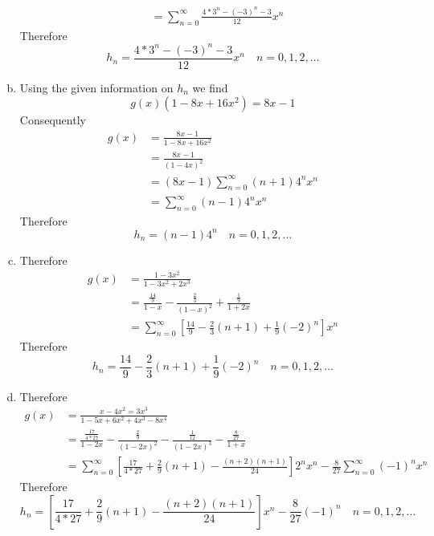 \documentclass[UTF8]{article}
\begin{document}
\begin{enumerate}[(a)]
\begin{equation}
\begin{aligned}
          &= \sum_{n = 0}^\infty \frac{4*3^{n} - {(-3)}^{n} - 3}{12} x^{n}
          \nonumber
          \end{aligned}
          \end{equation}
          Therefore
          $$ h_{n} = \frac{4*3^{n} - {(-3)}^{n} - 3}{12} x^{n} \quad n=0,1,2, \dots $$
    \item Using the given information on $ h_{n} $ we find
          $$ g(x)(1 - 8x + 16x^2)  = 8x - 1 $$
          Consequently
          \begin{equation}
          \begin{aligned}
          g(x) &= \frac{8x - 1}{1 - 8x + 16x^2} \\
          &= \frac{8x - 1}{(1 - 4x)^2} \\
          &= (8x - 1)\sum_{n = 0}^\infty (n + 1)4^n x^n \\
          &= \sum_{n = 0}^\infty (n - 1)4^n x^n
          \nonumber
          \end{aligned}
          \end{equation}
          Therefore
          $$ h_{n} = (n - 1)4^n \quad n=0,1,2, \dots $$
    \item Therefore
          \begin{equation}
          \begin{aligned}
          g(x) &= \frac{1 - 3x^2}{1 - 3x^2 + 2x^3} \\
          &= \frac{\frac{14}{9}}{1 - x} - \frac{\frac{2}{3}}{(1 - x)^2} + \frac{\frac{1}{9}}{1 + 2x} \\
          &= \sum_{n = 0}^\infty [\frac{14}{9} - \frac{2}{3}(n + 1) + \frac{1}{9}(-2)^n] x^{n}
          \nonumber
          \end{aligned}
          \end{equation}
          Therefore
          $$ h_{n} = \frac{14}{9} - \frac{2}{3}(n + 1) + \frac{1}{9}(-2)^n \quad n=0,1,2, \dots $$
    \item Therefore
          \begin{equation}
          \begin{aligned}
          g(x) &= \frac{x - 4x^2 = 3x^3}{1 - 5x + 6x^2 + 4x^3 - 8x^4} \\
          &= \frac{\frac{17}{4 * 27}}{1 - 2x} - \frac{\frac{2}{9}}{(1 - 2x)^2} -\frac{\frac{1}{12}}{(1 - 2x)^3} - \frac{\frac{8}{27}}{1 + x}\\
          &= \sum_{n = 0}^\infty [\frac{17}{4 * 27} + \frac{2}{9}(n + 1) - \frac{(n + 2)(n + 1)}{24}] 2^n x^{n} - \frac{8}{27} \sum_{n = 0}^\infty (-1)^n x^n
          \nonumber
          \end{aligned}
          \end{equation}
          Therefore
          $$ h_{n} = [\frac{17}{4 * 27} + \frac{2}{9}(n + 1) - \frac{(n + 2)(n + 1)}{24}] x^{n} - \frac{8}{27}  (-1)^n \quad n=0,1,2, \dots $$
\end{enumerate}
\end{document}
